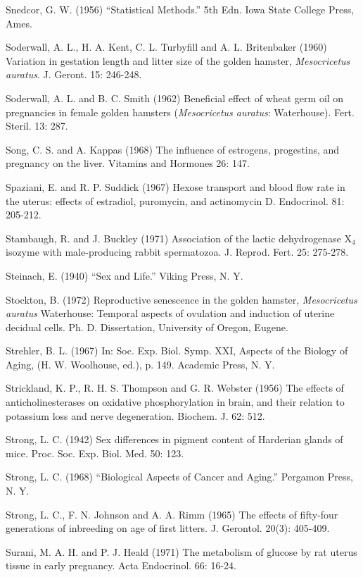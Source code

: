 Snedcor, G. W. (1956) ``Statistical Methods.'' 5th Edn. Iowa State College Press, Ames.

Soderwall, A. L., H. A. Kent, C. L. Turbyfill and A. L. Britenbaker (1960) Variation in gestation length and litter size of the golden hamster, \textit{Mesocricetus auratus}. J. Geront. 15: 246-248.

Soderwall, A. L. and B. C. Smith (1962) Beneficial effect of wheat germ oil on pregnancies in female golden hamsters (\textit{Mesocricetus auratus}: Waterhouse). Fert. Steril. 13: 287.

Song, C. S. and A. Kappas (1968) The influence of estrogens, progestins, and pregnancy on the liver. Vitamins and Hormones 26: 147.

Spaziani, E. and R. P. Suddick (1967) Hexose transport and blood flow rate in the uterus: effects of estradiol, puromycin, and actinomycin D. Endocrinol. 81: 205-212.

Stambaugh, R. and J. Buckley (1971) Association of the lactic dehydrogenase X$_4$ isozyme with male-producing rabbit spermatozoa. J. Reprod. Fert. 25: 275-278.

Steinach, E. (1940) ``Sex and Life.'' Viking Press, N. Y.

Stockton, B. (1972) Reproductive senescence in the golden hamster, \textit{Mesocricetus auratus} Waterhouse: Temporal aspects of ovulation and induction of uterine decidual cells. Ph. D. Dissertation, University of Oregon, Eugene.

Strehler, B. L. (1967) In: Soc. Exp. Biol. Symp. XXI, Aspects of the Biology of Aging, (H. W. Woolhouse, ed.), p. 149. Academic Press, N. Y.

Strickland, K. P., R. H. S. Thompson and G. R. Webster (1956) The effects of anticholinesterases on oxidative phosphorylation in brain, and their relation to potassium loss and nerve degeneration. Biochem. J. 62: 512.

Strong, L. C. (1942) Sex differences in pigment content of Harderian glands of mice. Proc. Soc. Exp. Biol. Med. 50: 123.

Strong, L. C. (1968) ``Biological Aspects of Cancer and Aging.'' Pergamon Press, N. Y.

Strong, L. C., F. N. Johnson and A. A. Rimm (1965) The effects of fifty-four generations of inbreeding on age of first litters. J. Gerontol. 20(3): 405-409.

Surani, M. A. H. and P. J. Heald (1971) The metabolism of glucose by rat uterus tissue in early pregnancy. Acta Endocrinol. 66: 16-24.

